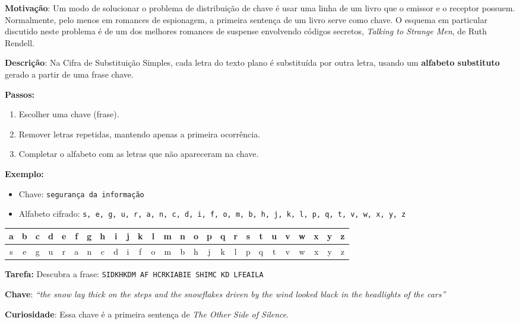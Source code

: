 \textbf{Motivação}:
Um modo de solucionar o problema de distribuição de chave é usar uma linha de um livro que o emissor e o receptor possuem. Normalmente, pelo menos em romances de espionagem, a primeira sentença de um livro serve como chave. O esquema em particular discutido neste problema é de um dos melhores romances de suspense envolvendo códigos secretos, \textit{Talking to Strange Men}, de Ruth Rendell.

\textbf{Descrição}:
Na Cifra de Substituição Simples, cada letra do texto plano é substituída por outra letra, usando um \textbf{alfabeto substituto} gerado a partir de uma frase chave.

\medskip
\textbf{Passos:}
\begin{enumerate}
    \item Escolher uma chave (frase).  
    \item Remover letras repetidas, mantendo apenas a primeira ocorrência.  
    \item Completar o alfabeto com as letras que não apareceram na chave.  
\end{enumerate}

\medskip
\textbf{Exemplo:}  
\begin{itemize}
    
    \item Chave: \texttt{segurança da informação}  
    \item Alfabeto cifrado: \texttt{s, e, g, u, r, a, n, c, d, i, f, o, m, b, h, j, k, l, p, q, t, v, w, x, y, z}  
\end{itemize}

\begin{table}[h]
\centering
\begin{tabular}{|*{26}{c|}}
\hline
a & b & c & d & e & f & g & h & i & j & k & l & m & n & o & p & q & r & s & t & u & v & w & x & y & z \\
\hline
s & e & g & u & r & a & n & c & d & i & f & o & m & b & h & j & k & l & p & q & t & v & w & x & y & z \\
\hline
\end{tabular}
\end{table}

\medskip
\textbf{Tarefa:}  
Descubra a frase: \texttt{SIDKHKDM AF HCRKIABIE SHIMC KD LFEAILA}


\textbf{Chave}: \emph{``the snow lay thick on the steps and the snowflakes driven by the wind looked black in the headlights of the cars''}

\textbf{Curiosidade}: Essa chave é a primeira sentença de \textit{The Other Side of Silence}.

